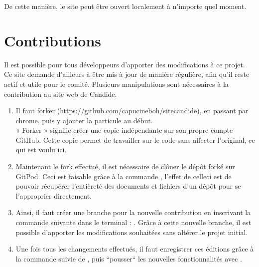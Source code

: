 \documentclass[a4,10pt,french]{sphinxmanual}
\begin{document}
\sphinxAtStartPar
De cette manière, le site peut être ouvert localement à n’importe quel moment.


\section{Contributions}
\label{\detokenize{chapitre-02:contributions}}
\sphinxAtStartPar
Il est possible pour tous développeurs d’apporter des modifications à ce projet. Ce site demande d’ailleurs à être mis à jour de manière régulière, afin qu’il reste actif et utile pour le comité. Plusieurs manipulations sont nécessaires à la contribution au site web de Candide.
\begin{enumerate}
%
\item {} 
\sphinxAtStartPar
Il faut forker  (https://github.com/capucineboh/site\sphinxhyphen{}candide)\sphinxfootnotemark[1], en passant par chrome, puis y ajouter la particule  au début.\\
« Forker » signifie créer une copie indépendante sur son propre compte GitHub. Cette copie permet de travailler sur le code sans affecter l’original, ce qui est voulu ici.

\item {} 
\sphinxAtStartPar
Maintenant le fork effectué, il est nécessaire de clôner le dépôt forké sur GitPod. Ceci est faisable grâce à la commande , l’effet de celle\sphinxhyphen{}ci est de pouvoir récupérer l’entièreté des documents et fichiers d’un dépôt pour se l’approprier directement.

\item {} 
\sphinxAtStartPar
Ainsi, il faut créer une branche pour la nouvelle contribution en inscrivant la commande suivante dans le terminal : . Grâce à cette nouvelle branche, il est possible d’apporter les modifications souhaitées sans altérer le projet initial.

\item {} 
\sphinxAtStartPar
Une fois tous les changements effectués, il faut enregistrer ces éditions grâce à la commande  suivie de , puis “pousser“ les nouvelles fonctionnalités avec .


\end{enumerate}
\end{document}
